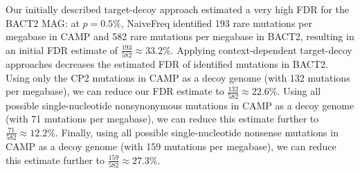 Our initially described target-decoy approach estimated a very high FDR for the BACT2 MAG:
at $p = 0.5\%$, NaiveFreq identified 193 rare mutations per megabase in CAMP and 582 rare mutations per megabase in BACT2, resulting in an initial FDR estimate of $\frac{193}{582} \approx 33.2\%$.
%
Applying context-dependent target-decoy approaches decreases the estimated FDR of identified mutations in BACT2.
%
Using only the CP2 mutations in CAMP as a decoy genome (with 132 mutations per megabase), we can reduce our FDR estimate to $\frac{132}{582} \approx 22.6\%$.
%
Using all possible single-nucleotide nonsynonymous mutations in CAMP as a decoy genome (with 71 mutations per megabase), we can reduce this estimate further to $\frac{71}{582} \approx 12.2\%$.
%
Finally, using all possible single-nucleotide nonsense mutations in CAMP as a decoy genome (with 159 mutations per megabase), we can reduce this estimate further to $\frac{159}{582} \approx 27.3\%$.
\endinput